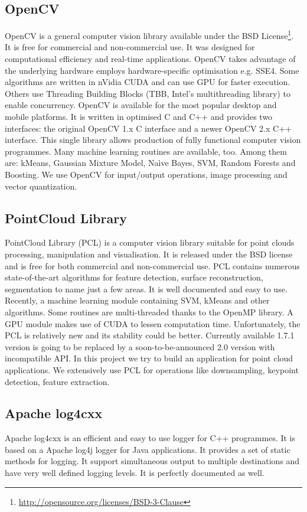 	\subsection{OpenCV}
	OpenCV is a general computer vision library available under the BSD License\footnote{\url{http://opensource.org/licenses/BSD-3-Clause}}. It is free for commercial and non-commercial use. It was designed for computational efficiency and real-time applications. OpenCV takes advantage of the underlying hardware employs hardware-specific optimisation e.g. SSE4. Some algorithms are written in nVidia CUDA and can use GPU for faster execution. Others use Threading Building Blocks (TBB, Intel's multithreading library) to enable concurrency. OpenCV is available for the most popular desktop and mobile platforms. It is written in optimised C and C++ and provides two interfaces: the original OpenCV 1.x C interface and a newer OpenCV 2.x C++ interface. This single library allows production of fully functional computer vision programmes. Many machine learning routines are available, too. Among them are: kMeans, Gaussian Mixture Model, Na\`ive Bayes, SVM, Random Forests and Boosting. We use OpenCV for input/output operations, image processing and vector quantization.
	
	\subsection{PointCloud Library}
	PointCloud Library (PCL) is a computer vision library suitable for point clouds processing, manipulation and visualisation. It is released under the BSD license and is free for both commercial and non-commercial use. PCL contains numerous state-of-the-art algorithms for feature detection, surface reconstruction, segmentation to name just a few areas. It is well documented and easy to use. Recently, a machine learning module containing SVM, kMeans and other algorithms. Some routines are multi-threaded thanks to the OpenMP library. A GPU module makes use of CUDA to lessen computation time. Unfortunately, the PCL is relatively new and its stability could be better. Currently available 1.7.1 version is going to be replaced by a soon-to-be-announced 2.0 version with incompatible API. In this project we try to build an application for point cloud applications. We extensively use PCL for operations like downsampling, keypoint detection, feature extraction.	
	
	\subsection{Apache log4cxx}
	Apache log4cxx is an efficient and easy to use logger for C++ programmes. It is based on a Apache log4j logger for Java applications. It provides a set of static methods for logging. It support simultaneous output to multiple destinations and have very well defined logging levels. It is perfectly documented as well.
	
